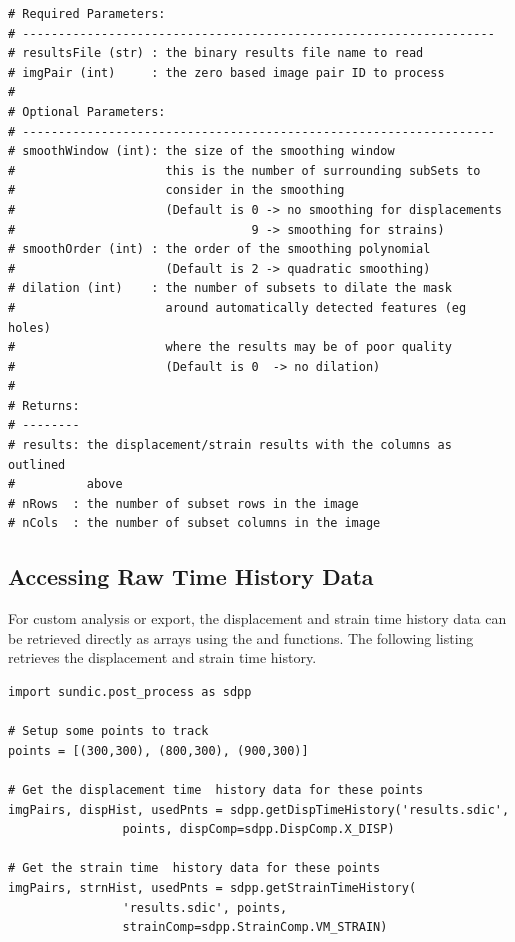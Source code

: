 \begin{lstlisting}
# Required Parameters:
# ------------------------------------------------------------------
# resultsFile (str) : the binary results file name to read
# imgPair (int)     : the zero based image pair ID to process
# 
# Optional Parameters:
# ------------------------------------------------------------------
# smoothWindow (int): the size of the smoothing window
#                     this is the number of surrounding subSets to 
#                     consider in the smoothing 
#                     (Default is 0 -> no smoothing for displacements
#                                 9 -> smoothing for strains)
# smoothOrder (int) : the order of the smoothing polynomial 
#                     (Default is 2 -> quadratic smoothing)
# dilation (int)    : the number of subsets to dilate the mask 
#                     around automatically detected features (eg holes) 
#                     where the results may be of poor quality 
#                     (Default is 0  -> no dilation)
#
# Returns:
# --------
# results: the displacement/strain results with the columns as outlined 
#          above
# nRows  : the number of subset rows in the image
# nCols  : the number of subset columns in the image
\end{lstlisting}

\subsection{Accessing Raw Time History Data}

For custom analysis or export, the displacement and strain time history data can be retrieved directly as  arrays using the  and  functions.  The following listing retrieves the displacement and strain time history.

\begin{lstlisting}
import sundic.post_process as sdpp

# Setup some points to track
points = [(300,300), (800,300), (900,300)]

# Get the displacement time  history data for these points
imgPairs, dispHist, usedPnts = sdpp.getDispTimeHistory('results.sdic', 
                points, dispComp=sdpp.DispComp.X_DISP)

# Get the strain time  history data for these points
imgPairs, strnHist, usedPnts = sdpp.getStrainTimeHistory(
                'results.sdic', points, 
                strainComp=sdpp.StrainComp.VM_STRAIN)
\end{lstlisting}

